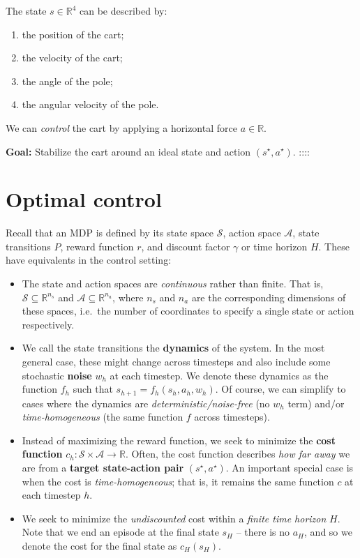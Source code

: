 \documentclass[
  letterpaper,
  DIV=11,
  numbers=noendperiod]{scrreprt}
\theoremstyle{plain}
\theoremstyle{plain}
\theoremstyle{definition}
\theoremstyle{definition}
\theoremstyle{remark}
\begin{document}
The state \(s\in \mathbb{R}^4\) can be described by:

\begin{enumerate}
\def\labelenumi{\arabic{enumi}.}
\item
  the position of the cart;
\item
  the velocity of the cart;
\item
  the angle of the pole;
\item
  the angular velocity of the pole.
\end{enumerate}

We can \emph{control} the cart by applying a horizontal force
\(a\in \mathbb{R}\).

\textbf{Goal:} Stabilize the cart around an ideal state and action
\((s^\star, a^\star)\). ::::

\section{Optimal control}\label{optimal-control}

Recall that an MDP is defined by its state space \(\mathcal{S}\), action
space \(\mathcal{A}\), state transitions \(P\), reward function \(r\),
and discount factor \(\gamma\) or time horizon \(H\). These have
equivalents in the control setting:

\begin{itemize}
\item
  The state and action spaces are \emph{continuous} rather than finite.
  That is, \(\mathcal{S} \subseteq \mathbb{R}^{n_s}\) and
  \(\mathcal{A} \subseteq \mathbb{R}^{n_a}\), where \(n_s\) and \(n_a\)
  are the corresponding dimensions of these spaces, i.e.~the number of
  coordinates to specify a single state or action respectively.
\item
  We call the state transitions the \textbf{dynamics} of the system. In
  the most general case, these might change across timesteps and also
  include some stochastic \textbf{noise} \(w_h\) at each timestep. We
  denote these dynamics as the function \(f_h\) such that
  \(s_{h+1} = f_h(s_h, a_h, w_h)\). Of course, we can simplify to cases
  where the dynamics are \emph{deterministic/noise-free} (no \(w_h\)
  term) and/or \emph{time-homogeneous} (the same function \(f\) across
  timesteps).
\item
  Instead of maximizing the reward function, we seek to minimize the
  \textbf{cost function}
  \(c_h: \mathcal{S} \times \mathcal{A} \to \mathbb{R}\). Often, the
  cost function describes \emph{how far away} we are from a
  \textbf{target state-action pair} \((s^\star, a^\star)\). An important
  special case is when the cost is \emph{time-homogeneous}; that is, it
  remains the same function \(c\) at each timestep \(h\).
\item
  We seek to minimize the \emph{undiscounted} cost within a \emph{finite
  time horizon} \(H\). Note that we end an episode at the final state
  \(s_H\) -- there is no \(a_H\), and so we denote the cost for the
  final state as \(c_H(s_H)\).
\end{itemize}
\end{document}
